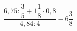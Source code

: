 \begin{ex}[type=calculate]
	\begin{condition}
		\( \dfrac{6,75:\dfrac{3}{5}+1\dfrac{1}{8}\cdot0,8}{4,84:4}-6\dfrac{3}{8} \)
	\end{condition}
\end{ex}